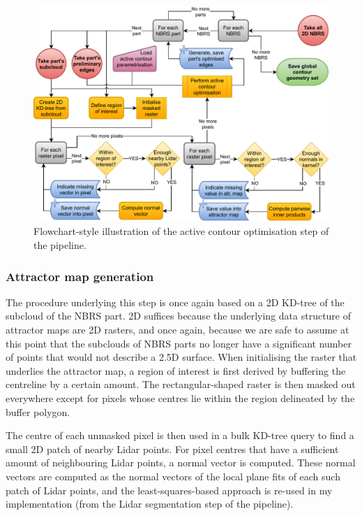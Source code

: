 \begin{figure}
    \centering
    \includegraphics[width=0.9\linewidth]{final_report/figs/edge_optimisation.pdf}
    \caption{Flowchart-style illustration of the active contour optimisation step of the pipeline.}
    \label{fig:edgeoptimisationflow}
\end{figure}

\subsubsection{Attractor map generation}

The procedure underlying this step is once again based on a 2D KD-tree of the subcloud of the NBRS part. 2D suffices because the underlying data structure of attractor maps are 2D rasters, and once again, because we are safe to assume at this point that the subclouds of NBRS parts no longer have a significant number of points that would not describe a 2.5D surface. When initialising the raster that underlies the attractor map, a region of interest is first derived by buffering the centreline by a certain amount. The rectangular-shaped raster is then masked out everywhere except for pixels whose centres lie within the region delineated by the buffer polygon.

The centre of each unmasked pixel is then used in a bulk KD-tree query to find a small 2D patch of nearby Lidar points. For pixel centres that have a sufficient amount of neighbouring Lidar points, a normal vector is computed. These normal vectors are computed as the normal vectors of the local plane fits of each such patch of Lidar points, and the least-squares-based approach is re-used in my implementation (from the Lidar segmentation step of the pipeline).


